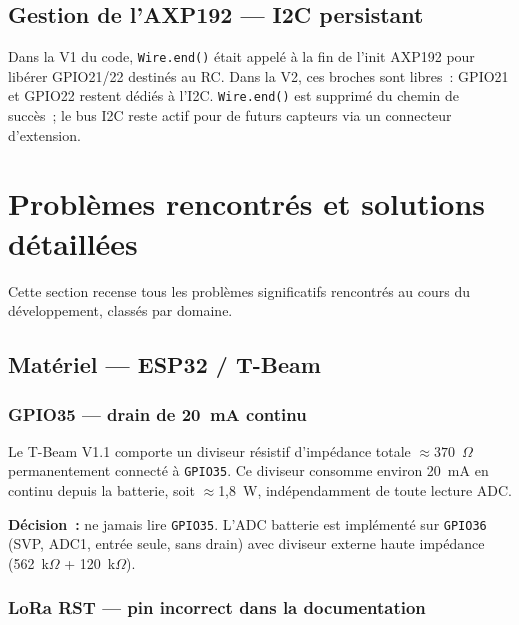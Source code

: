 \documentclass[12pt,a4paper]{article}
\newcommand{\gpio}[1]{\texttt{GPIO#1}}
\begin{document}
\subsection{Gestion de l'AXP192 — I2C persistant}

Dans la V1 du code, \texttt{Wire.end()} était appelé à la fin de l'init
AXP192 pour libérer GPIO21/22 destinés au RC. Dans la V2, ces broches sont
libres~: GPIO21 et GPIO22 restent dédiés à l'I2C. \texttt{Wire.end()} est
supprimé du chemin de succès~; le bus I2C reste actif pour de futurs
capteurs via un connecteur d'extension.

\section{Problèmes rencontrés et solutions détaillées}

Cette section recense tous les problèmes significatifs rencontrés au cours
du développement, classés par domaine.

\subsection{Matériel — ESP32 / T-Beam}

\subsubsection{GPIO35 — drain de 20~mA continu}

\begin{warningbox}
  Le T-Beam V1.1 comporte un diviseur résistif d'impédance totale
  $\approx370$~$\Omega$ permanentement connecté à \gpio{35}. Ce diviseur
  consomme environ 20~mA en continu depuis la batterie, soit $\approx$1,8~W,
  indépendamment de toute lecture ADC.
\end{warningbox}

\begin{okbox}
  \textbf{Décision~:} ne jamais lire \gpio{35}. L'ADC batterie est implémenté
  sur \gpio{36} (SVP, ADC1, entrée seule, sans drain) avec diviseur externe
  haute impédance (562~k$\Omega$ + 120~k$\Omega$).
\end{okbox}

\subsubsection{LoRa RST — pin incorrect dans la documentation}
\end{document}
